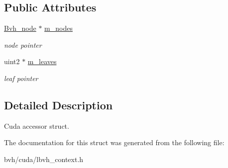 \subsection*{\-Public \-Attributes}
\begin{DoxyCompactItemize}
\item 
\hypertarget{structnih_1_1cuda_1_1_l_b_v_h__context_1_1_context_ab76a1346e3cb93f5361820cd7404261c}{
\hyperlink{structnih_1_1_bvh__node}{\-Bvh\-\_\-node} $\ast$ \hyperlink{structnih_1_1cuda_1_1_l_b_v_h__context_1_1_context_ab76a1346e3cb93f5361820cd7404261c}{m\-\_\-nodes}}
\label{structnih_1_1cuda_1_1_l_b_v_h__context_1_1_context_ab76a1346e3cb93f5361820cd7404261c}

\begin{DoxyCompactList}\small\item\em node pointer \end{DoxyCompactList}\item 
\hypertarget{structnih_1_1cuda_1_1_l_b_v_h__context_1_1_context_a1ef407bbbfb375bd9bcb48596e558598}{
uint2 $\ast$ \hyperlink{structnih_1_1cuda_1_1_l_b_v_h__context_1_1_context_a1ef407bbbfb375bd9bcb48596e558598}{m\-\_\-leaves}}
\label{structnih_1_1cuda_1_1_l_b_v_h__context_1_1_context_a1ef407bbbfb375bd9bcb48596e558598}

\begin{DoxyCompactList}\small\item\em leaf pointer \end{DoxyCompactList}\end{DoxyCompactItemize}


\subsection{\-Detailed \-Description}
\-Cuda accessor struct. 

\-The documentation for this struct was generated from the following file\-:\begin{DoxyCompactItemize}
\item 
bvh/cuda/lbvh\-\_\-context.\-h\end{DoxyCompactItemize}
